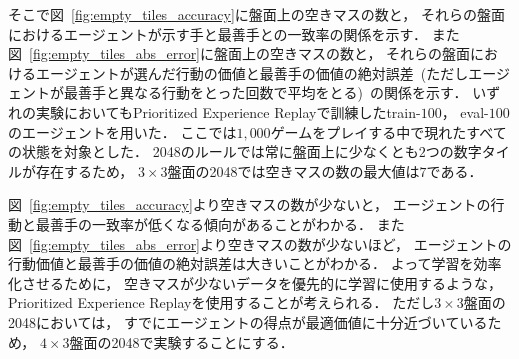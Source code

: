 そこで図~\ref{fig:empty_tiles_accuracy}に盤面上の空きマスの数と， それらの盤面におけるエージェントが示す手と最善手との一致率の関係を示す．
また図~\ref{fig:empty_tiles_abs_error}に盤面上の空きマスの数と， それらの盤面におけるエージェントが選んだ行動の価値と最善手の価値の絶対誤差~(ただしエージェントが最善手と異なる行動をとった回数で平均をとる)~の関係を示す．
いずれの実験においてもPrioritized Experience Replayで訓練したtrain-$100$， eval-$100$のエージェントを用いた．
ここでは$1,000$ゲームをプレイする中で現れたすべての状態を対象とした．
2048のルールでは常に盤面上に少なくとも$2$つの数字タイルが存在するため， $3\times3$盤面の2048では空きマスの数の最大値は$7$である．

図~\ref{fig:empty_tiles_accuracy}より空きマスの数が少ないと， エージェントの行動と最善手の一致率が低くなる傾向があることがわかる．
また図~\ref{fig:empty_tiles_abs_error}より空きマスの数が少ないほど， エージェントの行動価値と最善手の価値の絶対誤差は大きいことがわかる．
よって学習を効率化させるために， 空きマスが少ないデータを優先的に学習に使用するような， Prioritized Experience Replayを使用することが考えられる．
ただし$3\times3$盤面の2048においては， すでにエージェントの得点が最適価値に十分近づいているため， $4\times3$盤面の2048で実験することにする．
